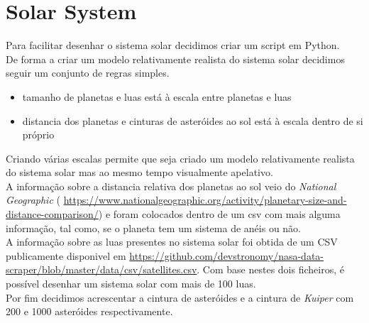 \documentclass[a4paper]{report}
\begin{document}
\chapter{Solar System}
Para facilitar desenhar o sistema solar decidimos criar um script em Python.\\
De forma a criar um modelo relativamente realista do sistema solar decidimos
seguir um conjunto de regras simples.

\begin{itemize}
        \item tamanho de planetas e luas está à escala entre planetas e luas
        \item distancia dos planetas e cinturas de asteróides ao sol está à
            escala dentro de si próprio
\end{itemize}
Criando várias escalas permite que seja criado um modelo relativamente realista
do sistema solar mas ao mesmo tempo visualmente apelativo.\\
A informação sobre a distancia relativa dos planetas ao sol veio do
\textit{National Geographic} (
\url{https://www.nationalgeographic.org/activity/planetary-size-and-distance-comparison/})
e foram colocados dentro de um csv com mais alguma informação, tal como, se o
planeta tem um sistema de anéis ou não.\\
A informação sobre as luas presentes no sistema solar foi obtida de um CSV
publicamente disponivel em
\url{https://github.com/devstronomy/nasa-data-scraper/blob/master/data/csv/satellites.csv}.
Com base nestes dois ficheiros, é possível desenhar um sistema solar com mais de
100 luas.\\
Por fim decidimos acrescentar a cintura de asteróides e a cintura de
\textit{Kuiper} com 200 e 1000 asteróides respectivamente.\\
\end{document}

